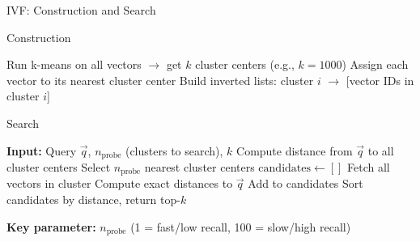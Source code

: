 \documentclass[aspectratio=169]{beamer}
\newif\ifanimated
\newcommand{\cpause}{\ifanimated\pause\fi}
\begin{document}
\begin{frame}[shrink=20]{IVF: Construction and Search}
\begin{block}{Construction}
\begin{algorithmic}[1]
\STATE Run k-means on all vectors $\rightarrow$ get $k$ cluster centers (e.g., $k=1000$)
\STATE Assign each vector to its nearest cluster center
\STATE Build inverted lists: cluster $i$ $\rightarrow$ [vector IDs in cluster $i$]
\end{algorithmic}
\end{block}
\cpause

\vspace{1em}

\begin{block}{Search}
\begin{algorithmic}[1]
\STATE \textbf{Input:} Query $\vec{q}$, $n_{\text{probe}}$ (clusters to search), $k$
\STATE Compute distance from $\vec{q}$ to all cluster centers
\STATE Select $n_{\text{probe}}$ nearest cluster centers
\STATE $\text{candidates} \gets []$
    \STATE Fetch all vectors in cluster
    \STATE Compute exact distances to $\vec{q}$
    \STATE Add to candidates
\ENDFOR
\STATE Sort candidates by distance, return top-$k$
\end{algorithmic}
\end{block}
\cpause

\vspace{0.5em}

\textbf{Key parameter:} $n_{\text{probe}}$ (1 = fast/low recall, 100 = slow/high recall)
\end{frame}
\end{document}
